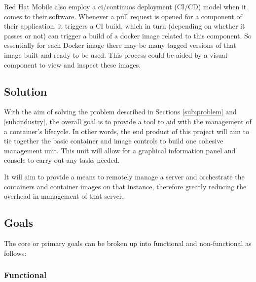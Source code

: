 Red Hat Mobile also employ a \gls{ci}/\gls{continuos deployment} (CI/CD) model when it comes to their software. Whenever a pull request is opened for a component of their application, it triggers a CI build, which in turn (depending on whether it passes or not) can trigger a build of a \gls{docker image} related to this component. So essentially for each Docker image there may be many tagged versions of that image built and ready to be used. This process could be aided by a visual component to view and inspect these images.


\subsection{Solution}
With the aim of solving the problem described in Sections \ref{sub:problem} and \ref{sub:industry}, the overall goal is to provide a tool to aid with the management of a \gls{container}'s lifecycle. In other words, the end product of this project will aim to tie together the basic container and image controls to build one cohesive management unit. This unit will allow for a graphical information panel and console to carry out any tasks needed.

It will aim to provide a means to remotely manage a server and orchestrate the containers and container images on that instance, therefore greatly reducing the overhead in management of that server.

\subsection{Goals}
\label{sub:goals}
The core or primary goals can be broken up into functional and non-functional as follows:

\subsubsection{Functional}

